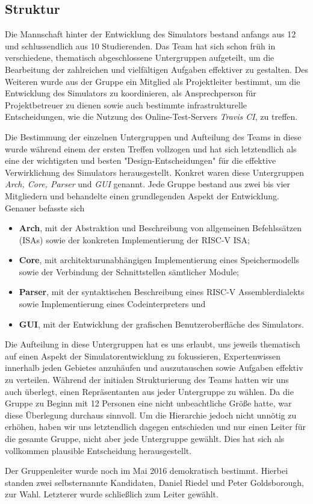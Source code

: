 
\subsection{Struktur}
\label{team:orga-structure}

Die Mannschaft hinter der Entwicklung des \erasim{} Simulators bestand anfangs
aus 12 und schlussendlich aus 10 Studierenden. Das Team hat sich schon früh in
verschiedene, thematisch abgeschlossene Untergruppen aufgeteilt, um die
Bearbeitung der zahlreichen und vielfältigen Aufgaben effektiver zu gestalten.
Des Weiteren wurde aus der Gruppe ein Mitglied als Projektleiter bestimmt, um
die Entwicklung des Simulators zu koordinieren, als Ansprechperson für
Projektbetreuer zu dienen sowie auch bestimmte infrastrukturelle Entscheidungen,
wie die Nutzung des Online-Test-Servers \emph{Travis CI}, zu treffen.

Die Bestimmung der einzelnen Untergruppen und Aufteilung des Teams in diese
wurde während einem der ersten Treffen vollzogen und hat sich letztendlich als
eine der wichtigsten und besten "Design-Entscheidungen" für die effektive
Verwirklichung des Simulators herausgestellt. Konkret waren diese Untergruppen
\emph{Arch, Core, Parser} und \emph{GUI} genannt. Jede Gruppe bestand aus zwei
bis vier Mitgliedern und behandelte einen grundlegenden Aspekt der Entwicklung.
Genauer befasste sich

\begin{itemize}
  \item \textbf{Arch}, mit der Abstraktion und Beschreibung von allgemeinen Befehlssätzen (ISAs) sowie der konkreten Implementierung der RISC-V ISA;
  \item \textbf{Core}, mit architekturunabhängigen Implementierung eines Speichermodells sowie der Verbindung der Schnittstellen sämtlicher Module;
  \item \textbf{Parser}, mit der syntaktischen Beschreibung eines RISC-V Assemblerdialekts sowie Implementierung eines Codeinterpreters und
  \item \textbf{GUI}, mit der Entwicklung der grafischen Benutzeroberfläche des Simulators.
\end{itemize}

Die Aufteilung in diese Untergruppen hat es uns erlaubt, uns jeweils thematisch
auf einen Aspekt der Simulatorentwicklung zu fokussieren, Expertenwissen
innerhalb jeden Gebietes anzuhäufen und auszutauschen sowie Aufgaben effektiv zu
verteilen. Während der initialen Strukturierung des Teams hatten wir uns auch
überlegt, einen Repräsentanten aus jeder Untergruppe zu wählen. Da die Gruppe zu
Beginn mit 12 Personen eine nicht unbeachtliche Größe hatte, war diese
Überlegung durchaus sinnvoll. Um die Hierarchie jedoch nicht unnötig zu erhöhen,
haben wir uns letztendlich dagegen entschieden und nur einen Leiter für die
gesamte Gruppe, nicht aber jede Untergruppe gewählt. Dies hat sich als
vollkommen plausible Entscheidung herausgestellt.

Der Gruppenleiter wurde noch im Mai 2016 demokratisch bestimmt. Hierbei standen
zwei selbsternannte Kandidaten, Daniel Riedel und Peter Goldsborough, zur Wahl.
Letzterer wurde schließlich zum Leiter gewählt.
